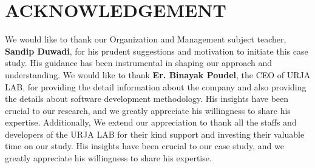 \chapter*{ACKNOWLEDGEMENT}

\begin{justify}
    We would like to thank our Organization and Management subject teacher, \textbf{Sandip Duwadi}, for his prudent suggestions and motivation to initiate this case study. His guidance has been instrumental in shaping our approach and understanding. We would like to thank \textbf{Er. Binayak Poudel}, the CEO of URJA LAB, for providing the detail information about the company and also providing the details about software development methodology. His insights have been crucial to our research, and we greatly appreciate his willingness to share his expertise. Additionally, We extend our appreciation to thank all the staffs and developers of the URJA LAB for their kind support and investing their valuable time on our study. His insights have been crucial to our case study, and we greatly appreciate his willingness to share his expertise.
\end{justify}
\newpage
